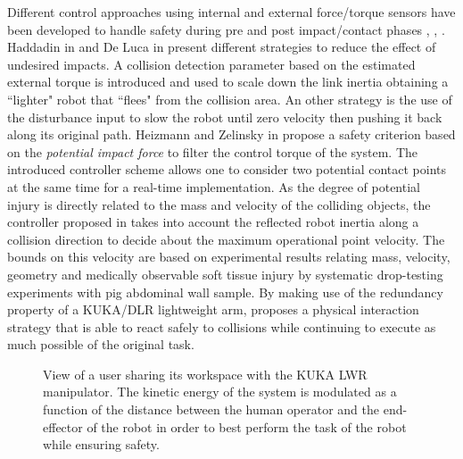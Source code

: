 \documentclass[a4paper, 10pt, conference]{ieeeconf}      %
\begin{document}
Different control approaches using internal and external force/torque sensors have been developed to handle safety during pre and post impact/contact phases \cite{ebert2002safe}, \cite{lumelsky1993real}, \cite{ikuta2003safety}. Haddadin in \cite{haddadin2008collision} and De Luca in \cite{de2006collision} present different strategies to reduce the effect of undesired impacts. A collision detection parameter based on the estimated external torque is introduced and used to scale down the link inertia obtaining a  ``lighter" robot that ``flees" from the collision area. An other strategy is the use of the disturbance input to slow the robot until zero velocity then pushing it back along its original path. Heizmann and Zelinsky in \cite{heinzmann2003quantitative} propose a safety criterion based on the \textit{potential impact force} to filter the control torque of the system. The introduced controller scheme allows one to  consider two potential contact points at the same time for a real-time implementation.
As the degree of potential injury is directly related to the mass and velocity of the colliding objects, the controller proposed in \cite{haddadin2012truly} takes into account the reflected robot inertia along a collision direction to decide about the maximum operational point velocity. The bounds on this velocity are based on experimental results relating mass, velocity, geometry and medically observable soft tissue injury by systematic drop-testing experiments with pig abdominal wall sample.
By making use of the redundancy property of a KUKA/DLR lightweight arm, \cite{de2008exploiting} proposes a physical interaction strategy that is able to react safely to collisions while continuing to execute as much possible of the original task.


\begin{figure}[t]
\centering
{}
\caption{View of a user sharing its workspace with the KUKA LWR manipulator. The kinetic energy of the system is modulated as a function of the distance between the human operator and the end-effector of the robot in order to best perform the task of the robot while ensuring safety.} 
\label{fig:experiment}
\end{figure}
\end{document}
